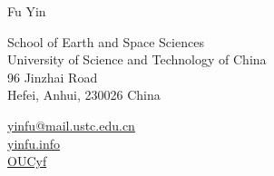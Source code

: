 \documentclass[11pt,a4paper]{article}
\makeatletter
\newcommand{\Name}{Fu Yin}
\newcommand{\CNName}{尹扶}
\newcommand{\Email}{yinfu@mail.ustc.edu.cn}
\newcommand{\Website}{yinfu.info}
\newcommand{\Github}{OUCyf}
\newcommand{\Affiliation}{School of Earth and Space Sciences \\ University of Science and Technology of China}
\newcommand{\Address}{96 Jinzhai Road \\ Hefei, Anhui, 230026 China}
\makeatother
\begin{document}
\thispagestyle{empty} %

\begin{center}
  {\fontsize{24pt}{0}\selectfont \Name \hspace{1ex} \kaishu{\CNName}} 
  \\[0.2cm]
\end{center}

\begin{minipage}[t]{0.7\textwidth}
  \fontsize{12pt}{15pt}\selectfont
  \Affiliation 
  \\
  \Address
\end{minipage}
\begin{minipage}[t]{0.3\textwidth}
  \fontsize{12pt}{15pt}\selectfont
  \begin{flushleft}
    \faEnvelope \href{mailto:\Email}{\Email} 
    \\
    \faGlobe \href{https://\Website}{\Website} 
    \\
    \faGithub \href{https://github.com/\Github}{\Github}
  \end{flushleft}
\end{minipage}

\vspace{0.2cm}

















\end{document}
